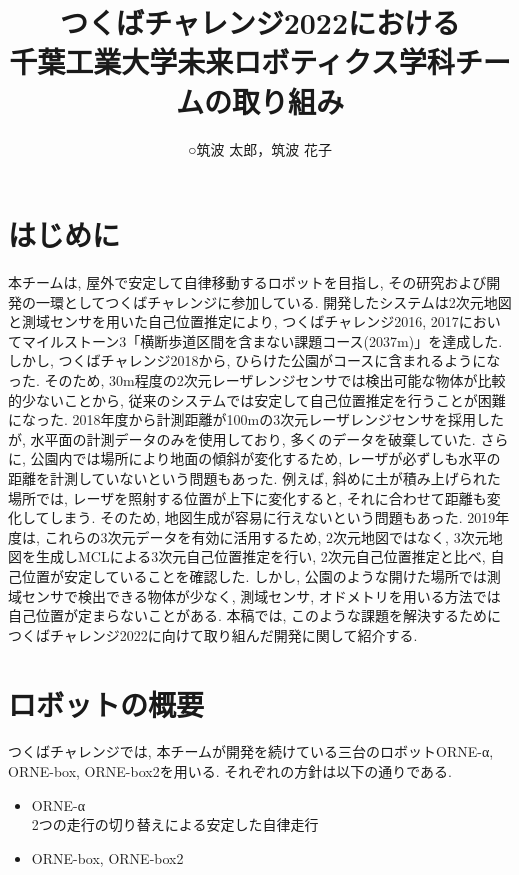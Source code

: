 \documentclass[uplatex, twocolumn, 9pt]{jsproceedings}
\title{つくばチャレンジ2022における\\千葉工業大学未来ロボティクス学科チームの取り組み}
\author{○筑波 太郎\authorrefmark{1}，筑波 花子\authorrefmark{1}}
\affiliation{千葉工業大学未来ロボティクス学科チームα, box, box2}
\begin{document}
\maketitle


\section{はじめに}
本チームは, 屋外で安定して自律移動するロボットを目指し, その研究および開発の一環としてつくばチャレンジに参加している. 開発したシステムは2次元地図と測域センサを用いた自己位置推定により, つくばチャレンジ2016, 2017においてマイルストーン3「横断歩道区間を含まない課題コース(2037m)」を達成した. しかし, つくばチャレンジ2018から, ひらけた公園がコースに含まれるようになった. そのため, 30m程度の2次元レーザレンジセンサでは検出可能な物体が比較的少ないことから, 従来のシステムでは安定して自己位置推定を行うことが困難になった. 2018年度から計測距離が100mの3次元レーザレンジセンサを採用したが, 水平面の計測データのみを使用しており, 多くのデータを破棄していた. さらに, 公園内では場所により地面の傾斜が変化するため, レーザが必ずしも水平の距離を計測していないという問題もあった. 例えば, 斜めに土が積み上げられた場所では, レーザを照射する位置が上下に変化すると, それに合わせて距離も変化してしまう. そのため, 地図生成が容易に行えないという問題もあった. 2019年度は, これらの3次元データを有効に活用するため, 2次元地図ではなく, 3次元地図を生成しMCLによる3次元自己位置推定を行い, 2次元自己位置推定と比べ, 自己位置が安定していることを確認した. しかし, 公園のような開けた場所では測域センサで検出できる物体が少なく, 測域センサ, オドメトリを用いる方法では自己位置が定まらないことがある. 本稿では, このような課題を解決するためにつくばチャレンジ2022に向けて取り組んだ開発に関して紹介する. 

\section{ロボットの概要}
つくばチャレンジでは, 本チームが開発を続けている三台のロボットORNE-α, ORNE-box, ORNE-box2を用いる. それぞれの方針は以下の通りである. 
\begin{itemize}
  \item ORNE-α\\2つの走行の切り替えによる安定した自律走行
  \item ORNE-box, ORNE-box2\\ 
\end{itemize}
\end{document}
